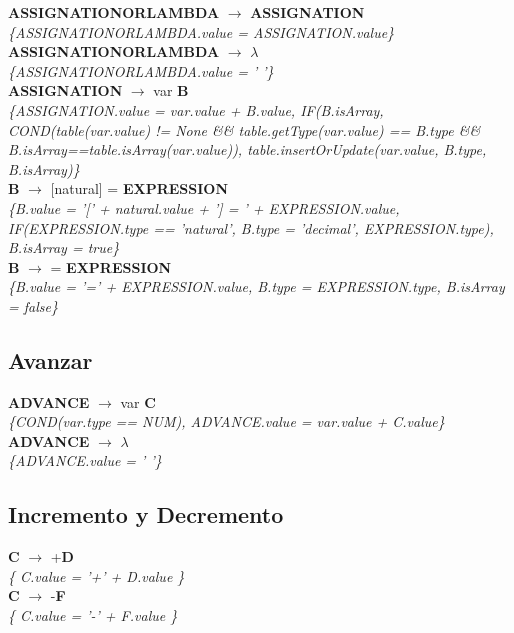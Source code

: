 \documentclass[10pt,a4paper]{article}
\begin{document}
\textbf{ASSIGNATIONORLAMBDA} $\rightarrow$ \textbf{ASSIGNATION} \\
\textit{\{ASSIGNATIONORLAMBDA.value = ASSIGNATION.value\}} \\

\textbf{ASSIGNATIONORLAMBDA} $\rightarrow$ $\lambda$ \\
\textit{\{ASSIGNATIONORLAMBDA.value = ' '\}} \\

\textbf{ASSIGNATION} $\rightarrow$ var \textbf{B} \\
\textit{\{ASSIGNATION.value = var.value + B.value, 
IF(B.isArray, COND(table(var.value) != None \&\& table.getType(var.value) == B.type \&\& B.isArray==table.isArray(var.value)), table.insertOrUpdate(var.value, B.type, B.isArray)\}} \\

\textbf{B} $\rightarrow$ [natural] = \textbf{EXPRESSION}  \\
\textit{\{B.value = '[' + natural.value + '] = ' + EXPRESSION.value, IF(EXPRESSION.type == 'natural', B.type = 'decimal', EXPRESSION.type), B.isArray = true\}} \\

\textbf{B} $\rightarrow$ = \textbf{EXPRESSION} \\
\textit{\{B.value = '=' + EXPRESSION.value, B.type = EXPRESSION.type, B.isArray = false\}} \\

\subsection{Avanzar}
\textbf{ADVANCE} $\rightarrow$ var \textbf{C} \\
\textit{\{COND(var.type == NUM), ADVANCE.value = var.value + C.value\}} \\

\textbf{ADVANCE} $\rightarrow$ $\lambda$ \\
\textit{\{ADVANCE.value = ' '\}} \\

\subsection{Incremento y Decremento}
\textbf{C} $\rightarrow$ +\textbf{D} \\ 
\textit{\{ C.value = '+' + D.value   \}} \\

\textbf{C} $\rightarrow$ -\textbf{F} \\
\textit{\{ C.value = '-' + F.value   \}} \\
\end{document}
